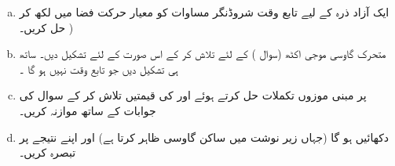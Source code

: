 \begin{enumerate}[a.]
\item  
 ایک آزاد ذرہ کے لیے تابع وقت  شروڈنگر مساوات کو معیار حرکت فضا  میں لکھ کر حل کریں۔    )  
\item
 متحرک گاوسی موجی اکٹھ (سوال ) کے لئے   تلاش کر کے اس صورت کے لئے   تشکیل دیں۔ ساتھ ہی  تشکیل دیں جو  تابع  وقت نہیں   ہو گا ۔   
 \item
   پر مبنی موزوں تکملات حل کرتے ہوئے  اور  کی قیمتیں تلاش کر کے سوال   کی    جوابات کے ساتھ موازنہ  کریں۔   
  \item
   دکھائیں     ہو گا  (جہاں زیر نوشت میں ساکن گاوسی  ظاہر کرتا ہے) اور اپنے نتیجے پر تبصرہ کریں۔
   \end{enumerate}


